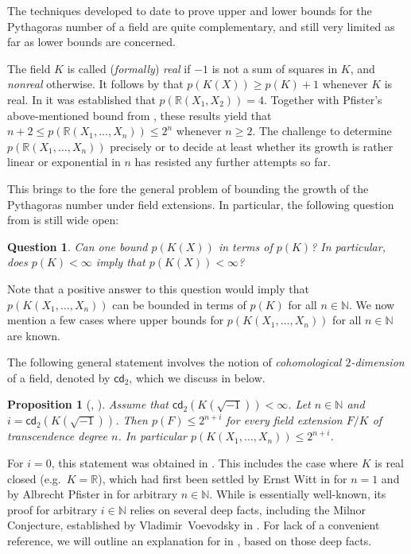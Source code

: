 \documentclass[12pt,leqno]{amsart}
\newcommand{\nat}{\mathbb{N}}
\newcommand{\rr}{\mathbb R}
\renewcommand{\leq}{\leqslant}
\renewcommand{\geq}{\geqslant}
\newcommand{\ctd}{\mathsf{cd}_2}
\numberwithin{equation}{section}
\newtheorem{prop}[equation]{Proposition}
\newtheorem{qu}[equation]{Question}
\theoremstyle{definition}
\theoremstyle{plain}
\begin{document}
The techniques developed to date to prove upper and lower bounds for the Pythagoras number of a field are quite complementary, and still very limited as far as lower bounds are concerned. 

The field $K$ is called (\emph{formally}) \emph{real} if $-1$ is not a sum of squares in $K$, and \emph{nonreal} otherwise. It follows by \cite[Theorem 2]{Cas64} that $p(K(X))\geq p(K)+1$ whenever $K$ is real.
In \cite{CEP71} it was established that $p(\rr(X_1,X_2))=4$.
Together with Pfister's above-mentioned bound from \cite{Pfi67}, these results yield that $n+2\leq p(\rr(X_1,\dots,X_n))\leq 2^n$ whenever $n\geq 2$. 
The challenge to determine $p(\rr(X_1,\dots,X_n))$ precisely or to decide at least whether its growth is rather linear or exponential in $n$ has resisted any further attempts so far. 

This brings to the fore the general problem of bounding the growth of the Pythagoras number under field extensions.
In particular, the following question from \cite[Question 8, p.~334]{Lam73} is still wide open:

\begin{qu}\label{Q-main}
Can one bound $p(K(X))$ in terms of $p(K)$? In particular, does $p(K)<\infty$ imply that $p(K(X))<\infty$?
\end{qu}

Note that a positive answer to this question would imply that
$p(K(X_1,\dots,X_n))$ can be bounded in terms of $p(K)$ for all $n\in\nat$.
We now mention a few cases where 
upper bounds for $p(K(X_1,\dots,X_n))$  for all $n\in\nat$ are known.


The following general statement involves the notion of \emph{cohomological $2$-dimen\-sion} of a field, denoted by $\ctd$, which we discuss in  below.

\begin{prop}[, ]\label{P:ctd-pyth-bound}
Assume that $\ctd(K(\sqrt{-1}))<\infty$. 
Let $n\in\nat$ and $i=\ctd(K(\sqrt{-1}))$. 
Then $p(F)\leq 2^{n+i}$ for every field extension $F/K$ of transcendence degree $n$. In particular $p(K(X_1,\dots,X_n))\leq 2^{n+i}$.
\end{prop}

For $i=0$, this statement was obtained in \cite{EW87}. 
This includes the case where $K$ is real closed (e.g.~$K=\rr$), which had first been settled by Ernst Witt in \cite{Witt34} for $n=1$ and by Albrecht Pfister in \cite{Pfi71} for arbitrary $n\in\nat$.
While  is essentially well-known, its proof for arbitrary $i\in\nat$ relies on several deep facts, including the Milnor Conjecture,  established by Vladimir~Voevodsky in \cite{Voe03}.
For lack of a convenient reference, we will outline an explanation for  in , based on those deep facts. 
\end{document}
